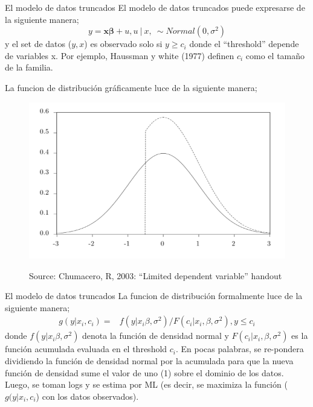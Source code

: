 \begin{frame}{El modelo de datos truncados}
	El modelo de datos truncados puede expresarse de la siguiente manera;
		\begin{equation}
			y=\boldsymbol{x\beta}+u, u \ | \ x, \ \sim Normal(0,\sigma^2)
		\end{equation}
	y el set de datos ($y,x$) es observado solo si $y\ge c_i$ donde el ``threshold'' depende de variables x. Por ejemplo, Haussman y white (1977) definen $c_i$ como el tama\~no de la familia.  
\end{frame}
\begin{frame}
	La funcion de distribución gráficamente luce de la siguiente manera;
		\begin{figure}[htbp]
			\hspace*{+1cm} 
			\centering
				\includegraphics[width=0.70\linewidth]{fig/truncated-model} %
			\label{trunc}
			\caption{Source: Chumacero, R, 2003: ``Limited dependent variable'' handout}
		\end{figure} 
\end{frame}
\begin{frame}{El modelo de datos truncados}
	La funcion de distribución formalmente luce de la siguiente manera;
		\begin{align}
			g(y|x_i,c_i)=&f(y|x_i\beta,\sigma^2)/F(c_i|x_i,\beta,\sigma^2), y\le c_i
		\end{align}
	donde $f(y|x_i\beta,\sigma^2)$ denota la función de densidad normal y $F(c_i|x_i,\beta,\sigma^2)$ es la función acumulada evaluada en el threshold $c_i$.
	En pocas palabras, se re-pondera dividiendo la función de densidad normal por la acumulada para que la nueva función de densidad sume el valor de uno (1) sobre el dominio de los datos.
	Luego, se toman logs y se estima por ML (es decir, se maximiza la función ($g(y|x_i,c_i$) con los datos observados).
\end{frame}
